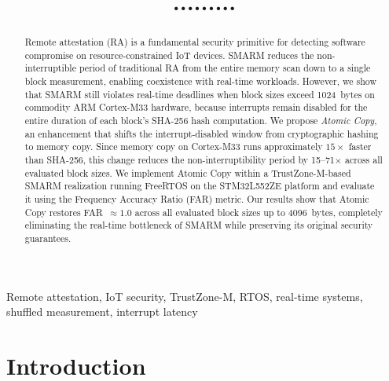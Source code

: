 \documentclass[conference]{IEEEtran}
\begin{document}
 
\title{.........}
 
\author{
}
 
\maketitle
 
\begin{abstract}
Remote attestation (RA) is a fundamental security primitive for
detecting software compromise on resource-constrained IoT devices.
SMARM reduces the non-interruptible period of traditional RA from the
entire memory scan down to a single block measurement, enabling
coexistence with real-time workloads. However, we show that SMARM
still violates real-time deadlines when block sizes exceed 1024~bytes
on commodity ARM Cortex-M33 hardware, because interrupts remain
disabled for the entire duration of each block's SHA-256 hash
computation.
We propose \emph{Atomic Copy}, an enhancement that shifts the
interrupt-disabled window from cryptographic hashing to memory copy.
Since memory copy on Cortex-M33 runs approximately $15\times$ faster
than SHA-256, this change reduces the non-interruptibility period
by 15--71$\times$ across all evaluated block sizes. We implement
Atomic Copy within a TrustZone-M-based SMARM realization running
FreeRTOS on the STM32L552ZE platform and evaluate it using the
Frequency Accuracy Ratio (FAR) metric. Our results show that Atomic
Copy restores FAR~$\approx 1.0$ across all evaluated block sizes up
to 4096~bytes, completely eliminating the real-time bottleneck of
SMARM while preserving its original security guarantees.
\end{abstract}
 
\begin{IEEEkeywords}
Remote attestation, IoT security, TrustZone-M, RTOS, real-time systems,
shuffled measurement, interrupt latency
\end{IEEEkeywords}

\section{Introduction}
\label{sec:intro}
 
\end{document}
